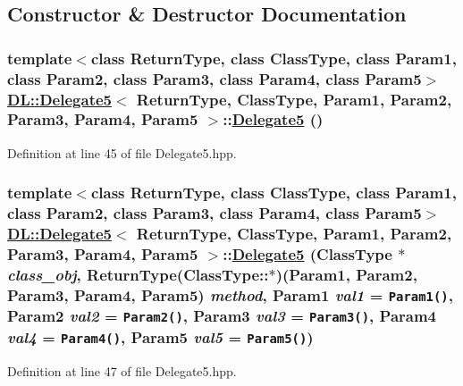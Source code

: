 \subsection{Constructor \& Destructor Documentation}
\hypertarget{classDL_1_1Delegate5_d0}{
\subsubsection[Delegate5]{\setlength{\rightskip}{0pt plus 5cm}template$<$class Return\-Type, class Class\-Type, class Param1, class Param2, class Param3, class Param4, class Param5$>$ \hyperlink{classDL_1_1Delegate5}{DL::Delegate5}$<$ Return\-Type, Class\-Type, Param1, Param2, Param3, Param4, Param5 $>$::\hyperlink{classDL_1_1Delegate5}{Delegate5} ()}}
\label{classDL_1_1Delegate5_d0}




Definition at line 45 of file Delegate5.hpp.\hypertarget{classDL_1_1Delegate5_a0}{
\subsubsection[Delegate5]{\setlength{\rightskip}{0pt plus 5cm}template$<$class Return\-Type, class Class\-Type, class Param1, class Param2, class Param3, class Param4, class Param5$>$ \hyperlink{classDL_1_1Delegate5}{DL::Delegate5}$<$ Return\-Type, Class\-Type, Param1, Param2, Param3, Param4, Param5 $>$::\hyperlink{classDL_1_1Delegate5}{Delegate5} (Class\-Type $\ast$ {\em class\_\-obj}, Return\-Type(Class\-Type::$\ast$)(Param1, Param2, Param3, Param4, Param5) {\em method}, Param1 {\em val1} = {\tt Param1()}, Param2 {\em val2} = {\tt Param2()}, Param3 {\em val3} = {\tt Param3()}, Param4 {\em val4} = {\tt Param4()}, Param5 {\em val5} = {\tt Param5()})}}
\label{classDL_1_1Delegate5_a0}




Definition at line 47 of file Delegate5.hpp.

